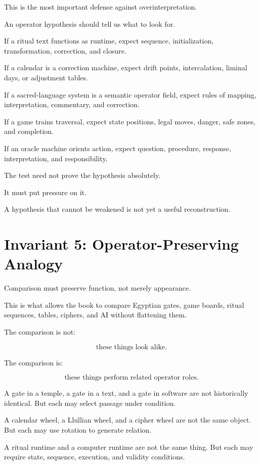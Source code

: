 \documentclass[11pt]{book}
\begin{document}
This is the most important defense against overinterpretation.

An operator hypothesis should tell us what to look for.

If a ritual text functions as runtime, expect sequence, initialization, transformation, correction, and closure.

If a calendar is a correction machine, expect drift points, intercalation, liminal days, or adjustment tables.

If a sacred-language system is a semantic operator field, expect rules of mapping, interpretation, commentary, and correction.

If a game trains traversal, expect state positions, legal moves, danger, safe zones, and completion.

If an oracle machine orients action, expect question, procedure, response, interpretation, and responsibility.

The test need not prove the hypothesis absolutely.

It must put pressure on it.

A hypothesis that cannot be weakened is not yet a useful reconstruction.

\section{Invariant 5: Operator-Preserving Analogy}

Comparison must preserve function, not merely appearance.

This is what allows the book to compare Egyptian gates, game boards, ritual sequences, tables, ciphers, and AI without flattening them.

The comparison is not:

\[
\text{these things look alike}.
\]

The comparison is:

\[
\text{these things perform related operator roles}.
\]

A gate in a temple, a gate in a text, and a gate in software are not historically identical. But each may select passage under condition.

A calendar wheel, a Llullian wheel, and a cipher wheel are not the same object. But each may use rotation to generate relation.

A ritual runtime and a computer runtime are not the same thing. But each may require state, sequence, execution, and validity conditions.
\end{document}
